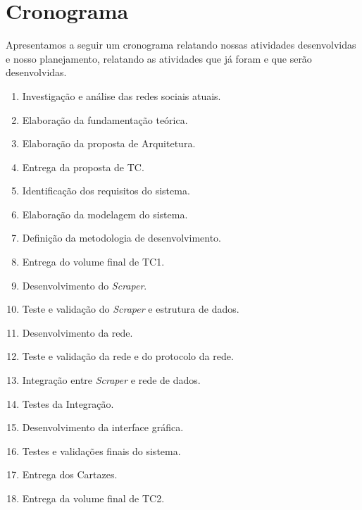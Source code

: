 \chapter{Cronograma}

Apresentamos a seguir um cronograma relatando nossas atividades desenvolvidas e nosso planejamento, relatando as atividades que já foram e que serão desenvolvidas.

\begin{enumerate}
    \item \label{cron:search} Investigação e análise das redes sociais atuais.
    \item \label{cron:background} Elaboração da fundamentação teórica.
    \item \label{cron:architecture} Elaboração da proposta de Arquitetura.
    \item \label{cron:proposal} Entrega da proposta de TC.
    \item \label{cron:requirements} Identificação dos requisitos do sistema.
    \item \label{cron:diagrams} Elaboração da modelagem do sistema.
    \item \label{cron:methodology} Definição da metodologia de desenvolvimento.
    \item \label{cron:esc-tcI}  Entrega do volume final de TC1.
    \item \label{cron:scraper} Desenvolvimento do \textit{Scraper}.
    \item \label{cron:val1}  Teste e validação do \textit{Scraper} e estrutura de dados.
    \item \label{cron:network} Desenvolvimento da rede.
    \item \label{cron:val2} Teste e validação da rede e do protocolo da rede.
    \item \label{cron:integration} Integração entre \textit{Scraper} e rede de dados.
    \item \label{cron:val3} Testes da Integração.
    \item \label{cron:gui} Desenvolvimento da interface gráfica.
    \item \label{cron:val4} Testes e validações finais do sistema.
    \item \label{cron:poster} Entrega dos Cartazes.
    \item \label{cron:esc-tcII} Entrega da volume final de TC2.
\end{enumerate}

